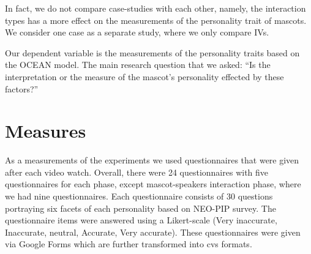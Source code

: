 In fact, we do not compare case-studies with each other, namely, the interaction types
has a more effect on the measurements of the personality trait of mascots.
We consider one case as a separate study, where we only compare IVs.
\par Our dependent variable is the measurements of the personality traits based on the OCEAN model.
The main research question that we asked: “Is the interpretation or the measure
of the mascot’s personality effected by these factors?”

\section{Measures}
\label{sec:measures}
As a measurements of the experiments we used questionnaires that were given after each video watch.
Overall, there were 24 questionnaires with five questionnaires for each phase, except
mascot-speakers interaction phase, where we had nine questionnaires.
Each questionnaire consists of 30 questions portraying six facets of each personality based on NEO-PIP survey.
The questionnaire items were answered using a Likert-scale
(Very inaccurate, Inaccurate, neutral, Accurate, Very accurate).
These questionnaires were given via Google Forms which are further transformed into cvs formats.



